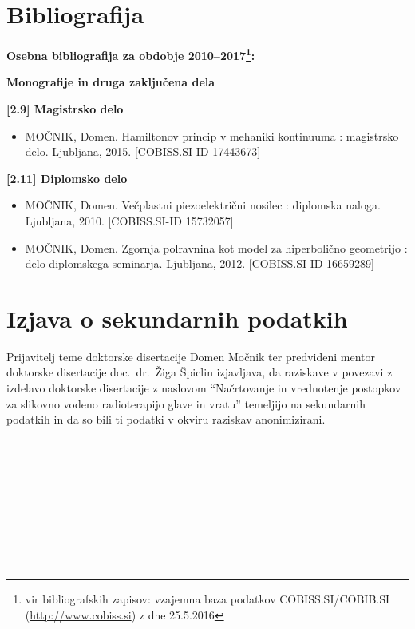 \documentclass[a4paper,twoside,11pt]{article}
\begin{document}
	\section{Bibliografija}
	\par{\noindent
		\textbf{Osebna bibliografija za obdobje 2010--2017\footnote{vir bibliografskih zapisov: vzajemna baza podatkov COBISS.SI/COBIB.SI (\href{http://www.cobiss.si}{http://www.cobiss.si}) z dne 25.5.2016}: \\}
		\par{\noindent \textbf{Monografije in druga zaključena dela} \\}
		\vspace{-0.3cm}
		\par{\noindent \textbf{[2.9] Magistrsko delo}}
		\begin{itemize}[align=right, itemsep=-0.05cm]
			\item[1.] MOČNIK, Domen. Hamiltonov princip v mehaniki kontinuuma : magistrsko delo. Ljubljana, 2015. [COBISS.SI-ID 17443673]
		\end{itemize}
		\par{\noindent \textbf{[2.11] Diplomsko delo}}
		\begin{itemize}[align=right, itemsep=-0.05cm]
			\item[2.] MOČNIK, Domen. Večplastni piezoelektrični nosilec : diplomska naloga. Ljubljana, 2010. [COBISS.SI-ID 15732057]
			\item[3.] MOČNIK, Domen. Zgornja polravnina kot model za hiperbolično geometrijo : delo diplomskega seminarja. Ljubljana, 2012. [COBISS.SI-ID 16659289]
		\end{itemize}

		\newpage
		\section{Izjava o sekundarnih podatkih}
		\par{		
		Prijavitelj teme doktorske disertacije Domen Močnik ter predvideni mentor doktorske disertacije doc.\ dr.\ Žiga Špiclin izjavljava, da raziskave v povezavi z izdelavo doktorske disertacije z naslovom ``Načrtovanje in vrednotenje postopkov za slikovno vodeno radioterapijo glave in vratu'' temeljijo na sekundarnih podatkih in da so bili ti podatki v okviru raziskav anonimizirani.
		}
		\\\\\\
		\noindent{}
		\\\\\\
		\noindent{} \hfill{}
		\\\\\\
		\noindent{} \hfill{}\\
		
}
\end{document}
